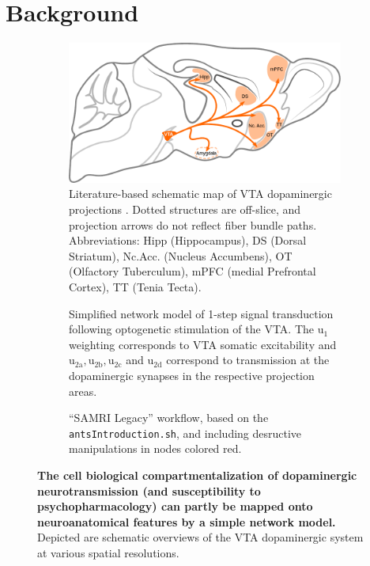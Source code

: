\section{Background}

\begin{figure}[h!]
	\begin{subfigure}{.53\textwidth}
		\centering
		\includegraphics[width=\textwidth]{img/model_literature}
		\caption{
			Literature-based schematic map of VTA dopaminergic projections \cite{Aransay2015,Fields2007,Ikemoto2007,Hnasko2012}.
			Dotted structures are off-slice, and projection arrows do not reflect fiber bundle paths.
			Abbreviations: Hipp (Hippocampus), DS (Dorsal Striatum), Nc.Acc. (Nucleus Accumbens), OT (Olfactory Tuberculum), mPFC (medial Prefrontal Cortex), TT (Tenia Tecta).
			}
		\label{fig:ml}
	\end{subfigure}
	\begin{subfigure}{.45\textwidth}
		\centering
		\vspace{-1em}
		\vspace{-1.8em}
		\caption{
			Simplified network model of 1-step signal transduction following optogenetic stimulation of the VTA.
			The $\mathrm{u_1}$ weighting corresponds to VTA somatic excitability and $\mathrm{u_{2a},u_{2b},u_{2c}}$ and $\mathrm{u_{2d}}$ correspond to transmission at the dopaminergic synapses in the respective projection areas.
			}
		\label{fig:md}
	\end{subfigure}
	\begin{subfigure}{.96\textwidth}
		\centering
		\caption{
			“SAMRI Legacy” workflow, based on the \textcolor{mg}{\texttt{antsIntroduction.sh}}, and including desructive manipulations in nodes colored red.
			}
		\label{fig:nm}
	\end{subfigure}
	\caption{
		\textbf{The cell biological compartmentalization of dopaminergic neurotransmission (and susceptibility to psychopharmacology) can partly be mapped onto neuroanatomical features by a simple network model.}
		Depicted are schematic overviews of the VTA dopaminergic system at various spatial resolutions.
		}
	\label{fig:m}
\end{figure}

